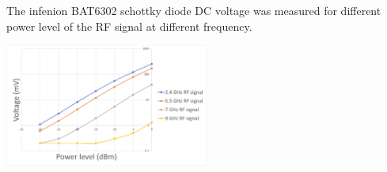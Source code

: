 \documentclass[12pt,a4paper,bold]{thesis}
\theoremstyle{thm}
\theoremstyle{definition}
\begin{document}
\begin{minipage}[b]{0.48\linewidth}
The infenion BAT6302 schottky diode DC voltage was measured for different power level of the RF signal at different frequency.\\
\end{minipage}
\hfill
\begin{minipage}[b]{0.48\linewidth}
\includegraphics[width=6.7cm]{Images/75.png} 
\end{minipage}
\end{document}
